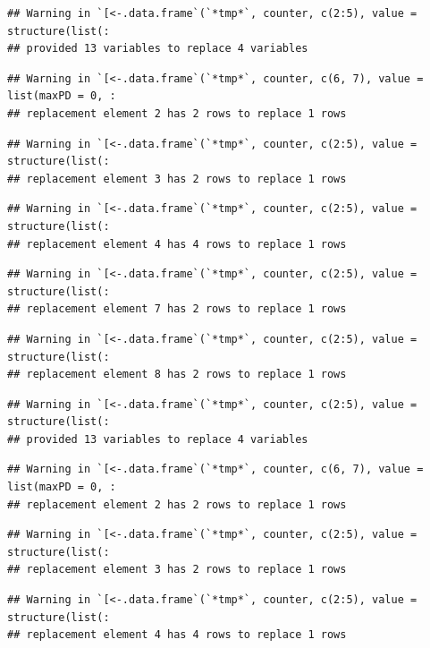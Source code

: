 \documentclass[]{article}
\begin{document}
\begin{verbatim}
## Warning in `[<-.data.frame`(`*tmp*`, counter, c(2:5), value = structure(list(:
## provided 13 variables to replace 4 variables
\end{verbatim}

\begin{verbatim}
## Warning in `[<-.data.frame`(`*tmp*`, counter, c(6, 7), value = list(maxPD = 0, :
## replacement element 2 has 2 rows to replace 1 rows
\end{verbatim}

\begin{verbatim}
## Warning in `[<-.data.frame`(`*tmp*`, counter, c(2:5), value = structure(list(:
## replacement element 3 has 2 rows to replace 1 rows
\end{verbatim}

\begin{verbatim}
## Warning in `[<-.data.frame`(`*tmp*`, counter, c(2:5), value = structure(list(:
## replacement element 4 has 4 rows to replace 1 rows
\end{verbatim}

\begin{verbatim}
## Warning in `[<-.data.frame`(`*tmp*`, counter, c(2:5), value = structure(list(:
## replacement element 7 has 2 rows to replace 1 rows
\end{verbatim}

\begin{verbatim}
## Warning in `[<-.data.frame`(`*tmp*`, counter, c(2:5), value = structure(list(:
## replacement element 8 has 2 rows to replace 1 rows
\end{verbatim}

\begin{verbatim}
## Warning in `[<-.data.frame`(`*tmp*`, counter, c(2:5), value = structure(list(:
## provided 13 variables to replace 4 variables
\end{verbatim}

\begin{verbatim}
## Warning in `[<-.data.frame`(`*tmp*`, counter, c(6, 7), value = list(maxPD = 0, :
## replacement element 2 has 2 rows to replace 1 rows
\end{verbatim}

\begin{verbatim}
## Warning in `[<-.data.frame`(`*tmp*`, counter, c(2:5), value = structure(list(:
## replacement element 3 has 2 rows to replace 1 rows
\end{verbatim}

\begin{verbatim}
## Warning in `[<-.data.frame`(`*tmp*`, counter, c(2:5), value = structure(list(:
## replacement element 4 has 4 rows to replace 1 rows
\end{verbatim}
\end{document}
